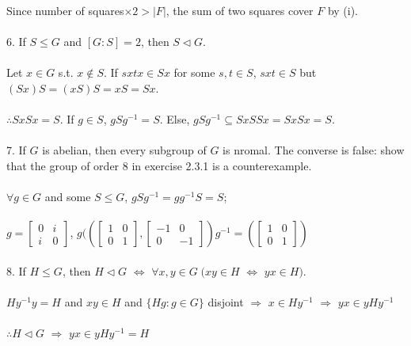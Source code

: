 \documentclass{article}
\begin{document}
\begin{siderules}
\null\qquad Since number of squares\(\times 2>|F|\), the sum of two squares cover \(F\) by \color{gray}(i)\color{black}.\\\\
\color{blue}6. If \(S\le G\) and \([G:S]=2\), then \(S\vartriangleleft G\).\\\\\color{black}
\null\qquad Let \(x\in G\) s.t. \(x\notin S\). If \(sxtx\in Sx\) for some \(s,t\in S\), \(sxt\in S\) but \((Sx)S=(xS)S=xS=Sx\).\\\\
\null\qquad \(\therefore SxSx=S\). If \(g\in S\), \(gSg^{-1}=S\). Else, \(gSg^{-1}\subseteq SxSSx=SxSx=S\).\\\\
\color{blue}7. If \(G\) is abelian, then every subgroup of \(G\) is nromal. The converse is false: show that the group of order \(8\) in \color{gray}exercise 2.3.1 \color{black} is a counterexample.\\\\\color{black}
\null\qquad \(\forall g\in G\) and some \(S\le G\), \(gSg^{-1}=gg^{-1}S=S\);\\\\
\null\qquad \(g=\begin{bmatrix}0&i\\i&0\end{bmatrix}\), \(g(\left(\begin{bmatrix}1&0\\0&1\end{bmatrix},\begin{bmatrix}-1&0\\0&-1\end{bmatrix}\right)g^{-1}=\left(\begin{bmatrix}1&0\\0&1\end{bmatrix}\right)\)\\\\
\color{blue}8. If \(H\le G\), then \(H\vartriangleleft G\) \(\Longleftrightarrow\) \(\forall x,y\in G\;(xy\in H\) \(\Longleftrightarrow\) \(yx\in H)\).\\\\\color{black}
\null\qquad \(Hy^{-1}y=H\) and \(xy\in H\) and \(\{Hg:g\in G\}\) disjoint \(\Longrightarrow\) \(x\in Hy^{-1}\) \(\Longrightarrow\) \(yx\in yHy^{-1}\)\\\\
\null\qquad \(\therefore H\vartriangleleft G\) \(\Longrightarrow\) \(yx\in yHy^{-1}= H\)\\\\

\end{siderules}
\end{document}
